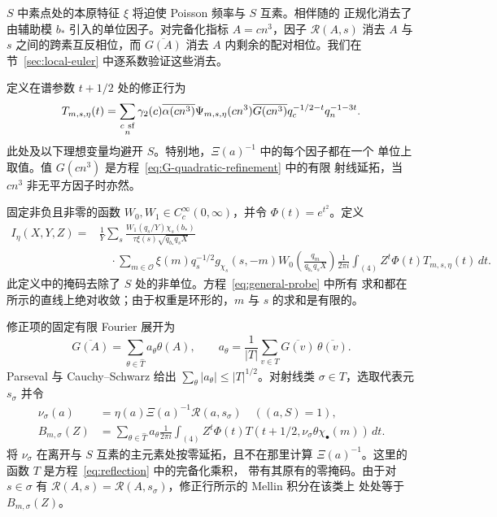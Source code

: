 $S$ 中素点处的本原特征 $\xi$ 将迫使 Poisson 频率与 $S$ 互素。相伴随的
正规化消去了由辅助模 $b_*$ 引入的单位因子。对完备化指标 $A=cn^3$，因子
$\mathcal R(A,s)$ 消去 $A$ 与 $s$ 之间的跨素互反相位，而
$\overline{G(A)}$ 消去 $A$ 内剩余的配对相位。我们在
节~\ref{sec:local-euler} 中逐系数验证这些消去。

定义在谱参数 $t+1/2$ 处的修正行为
\[
 T_{m,s,\eta}(t)=
 \sum_{\substack{c\ {\rm sf}\\n}}
 \gamma_2(c)\overline{\alpha(cn^3)}\Psi_{m,s,\eta}(cn^3)
 \overline{G(cn^3)}q_c^{-1/2-t}q_n^{-1-3t}.
\]
此处及以下理想变量均避开 $S$。特别地，$\Xi(a)^{-1}$ 中的每个因子都在一个
单位上取值。值 $G(cn^3)$ 是方程~\eqref{eq:G-quadratic-refinement} 中的有限
射线延拓，当 $cn^3$ 非无平方因子时亦然。

固定非负且非零的函数 $W_0,W_1\in C_c^\infty(0,\infty)$，并令
$\Phi(t)=e^{t^2}$。定义
\begin{equation}\label{eq:general-probe}
\begin{aligned}
 I_\eta(X,Y,Z)={}&\frac1Y\sum_s
 \frac{W_1(q_s/Y)\chi_s(b_*)}
      {\tau\xi(s)\sqrt{q_{b_*}q_sX}}\\
 &\quad\cdot\sum_{m\in\mathcal O}
       \xi(m)q_s^{-1/2}g_{\chi_s}(s,-m)
       W_0\!\left(\frac{q_m}{q_{b_*}q_sX}\right)
       \frac1{2\pi i}\int_{(4)}
             Z^t\Phi(t)T_{m,s,\eta}(t)\,dt.
\end{aligned}
\end{equation}
此定义中的掩码去除了 $S$ 处的非单位。方程~\eqref{eq:general-probe} 中所有
求和都在所示的直线上绝对收敛；由于权重是环形的，$m$ 与 $s$ 的求和是有限的。

修正项的固定有限 Fourier 展开为
\[
 \overline{G(A)}=\sum_{\theta\in\widehat T}a_\theta\theta(A),
 \qquad
 a_\theta=\frac1{|T|}\sum_{v\in T}
                 \overline{G(v)}\,\overline{\theta(v)}.
\]
Parseval 与 Cauchy--Schwarz 给出
$\sum_\theta|a_\theta|\le |T|^{1/2}$。对射线类
$\sigma\in T$，选取代表元 $s_\sigma$ 并令
\[
 \begin{aligned}
 \nu_\sigma(a)&=\eta(a)\Xi(a)^{-1}\mathcal R(a,s_\sigma)
       \quad ((a,S)=1),\\
 B_{m,\sigma}(Z)&=\sum_{\theta\in\widehat T}a_\theta
 \frac1{2\pi i}\int_{(4)}Z^t\Phi(t)
       T(t+1/2,\nu_\sigma\theta\chi_\bullet(m))\,dt.
 \end{aligned}
\]
将 $\nu_\sigma$ 在离开与 $S$ 互素的主元素处按零延拓，且不在那里计算
$\Xi(a)^{-1}$。这里的函数 $T$ 是方程~\eqref{eq:reflection} 中的完备化乘积，
带有其原有的零掩码。由于对 $s\in\sigma$ 有
$\mathcal R(A,s)=\mathcal R(A,s_\sigma)$，修正行所示的 Mellin 积分在该类上
处处等于 $B_{m,\sigma}(Z)$。

